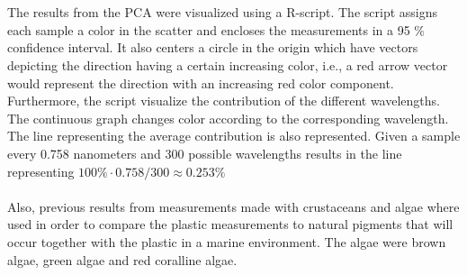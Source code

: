 \\\\
The results from the PCA were visualized using a R-script. The script assigns each sample a color in the scatter and encloses the measurements in a 95 \% confidence interval. It also centers a circle in the origin which have vectors depicting the direction having a certain increasing color, i.e., a red arrow vector would represent the direction with an increasing red color component. Furthermore, the script visualize the contribution of the different wavelengths. The continuous graph changes color according to the corresponding wavelength. The line representing the average contribution is also represented. Given a sample every 0.758 nanometers and 300 possible wavelengths results in the line representing $100\% \cdot 0.758/300 \approx 0.253 \% $
\\\\
Also, previous results from measurements made with crustaceans and algae where used in order to compare the plastic measurements to natural pigments that will occur together with the plastic in a marine environment. The algae were brown algae, green algae and red coralline algae.





















